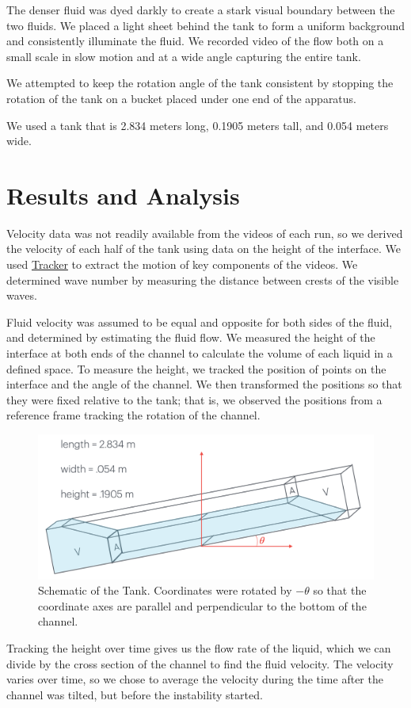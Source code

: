 \documentclass{article}
\begin{document}
The denser fluid was dyed darkly to create a stark visual boundary between the
two fluids. We placed a light sheet behind the tank to form a uniform background
and consistently illuminate the fluid. We recorded video of the flow both on a
small scale in slow motion and at a wide angle capturing the entire tank.

We attempted to keep the rotation angle of the tank consistent by stopping the
rotation of the tank on a bucket placed under one end of the apparatus.

We used a tank that is 2.834 meters long, 0.1905 meters tall, and 0.054 meters
wide.

\section{Results and Analysis}

Velocity data was not readily available from the videos of each run, so we
derived the velocity of each half of the tank using data on the height of the
interface. We used \href{https://physlets.org/tracker/}{Tracker} to extract the
motion of key components of the videos. We determined wave number by measuring
the distance between crests of the visible waves.

Fluid velocity was assumed to be equal and opposite for both sides of the fluid,
and determined by estimating the fluid flow. We measured the height of the
interface at both ends of the channel to calculate the volume of each liquid in
a defined space. To measure the height, we tracked the position of points on the
interface and the angle of the channel. We then transformed the positions so
that they were fixed relative to the tank; that is, we observed the positions
from a reference frame tracking the rotation of the channel.
\begin{figure}[h]
    \centering
    \includegraphics[width=5in]{tank-schematic.png}
    \caption{Schematic of the Tank. Coordinates were rotated by $-\theta$ so that the coordinate axes are parallel and perpendicular to the bottom of the channel.}
    \label{img:tank-schematic}
\end{figure}
Tracking the height
over time gives us the flow rate of the liquid, which we can divide by the cross
section of the channel to find the fluid velocity. The velocity varies over
time, so we chose to average the velocity during the time after the channel was
tilted, but before the instability started.
\end{document}
